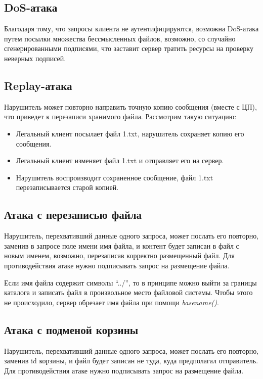\documentclass[a4paper,12pt]{article}
\begin{document}
\subsection{DoS-атака}

Благодаря тому, что запросы клиента не аутентифицируются, возможна DoS-атака путем посылки множества бессмысленных файлов, возможно, со случайно сгенерированными подписями, что заставит сервер тратить ресурсы на проверку неверных подписей.

\subsection{Replay-атака}

Нарушитель может повторно направить точную копию сообщения (вместе с ЦП), что приведет к перезаписи хранимого файла. Рассмотрим такую ситуацию:
\begin{itemize}
 \item Легальный клиент посылает файл 1.txt, нарушитель сохраняет копию его сообщения.
 \item Легальный клиент изменяет файл 1.txt и отправляет его на сервер.
 \item Нарушитель воспроизводит сохраненное сообщение, файл 1.txt перезаписывается старой копией.
\end{itemize}

\subsection{Атака с перезаписью файла} 

Нарушитель, перехвативший данные одного запроса, может послать его повторно, заменив  в запросе поле имени имя файла, и контент будет записан в файл с новым именем, возможно, перезаписав корректно размещенный файл. Для противодействия атаке нужно подписывать запрос на размещение файла.

Если имя файла содержит символы ``../'', то в принципе можно выйти за границы каталога и записать файл 
в произвольное место файловой системы. Чтобы этого не происходило, сервер обрезает имя файла при помощи \emph{basename()}.

 
\subsection{Атака с подменой корзины}

Нарушитель, перехвативший данные одного запроса, может послать его повторно, заменив id корзины, и файл будет записан не туда,
куда предполагал отправитель. Для противодействия атаке нужно подписывать запрос на размещение файла.
\end{document}
